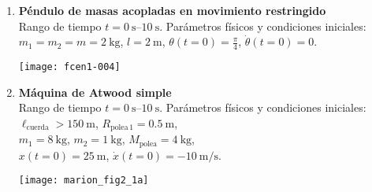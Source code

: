 \documentclass[11pt, spanish, a4paper, twoside]{article}
\begin{document}
\begin{enumerate}
\item 
\begin{minipage}[t][2.5cm]{0.7\textwidth}
\textbf{Péndulo de masas acopladas en movimiento restringido}\\ 
Rango de tiempo \(t = \SIrange{0}{10}{\second}\).
Parámetros físicos y condiciones iniciales:\\
\(m_1 = m_2 = m = \SI{2}{\kilo\gram}\), \(l = \SI{2}{\metre}\), \(\theta(t=0) = \frac{\pi}{4}\), \(\dot{\theta}(t=0) = 0\).
\end{minipage}
\begin{minipage}[c][1.5cm][t]{0.3\textwidth}
	\hspace{0.5cm}
   \texttt{[image: fcen1-004]}
\end{minipage}



%



\vspace{-0.9cm}
\item 
\begin{minipage}[t][3cm]{0.7\textwidth}
\textbf{Máquina de Atwood simple}\\
Rango de tiempo \(t = \SIrange{0}{10}{\second}\).
Parámetros físicos y condiciones iniciales:\\
\(\ell_\mathrm{cuerda} > \SI{150}{\metre}\), 
\(R_{\mathrm{polea}\,1} = \SI{0.5}{\metre}\), \\ 
\(m_1 = \SI{8}{\kilo\gram}\), 
\(m_2 = \SI{1}{\kilo\gram}\), 
\(M_\mathrm{polea} = \SI{4}{\kilo\gram}\), \\
\(x(t=0) = \SI{25}{\metre}\), 
\(\dot{x}(t=0) = -\SI{10}{\metre\per\second}\).
\end{minipage}
\begin{minipage}[c][3cm][t]{0.3\textwidth}
	\hspace{0.5cm}
	\texttt{[image: marion\_fig2\_1a]}
\end{minipage}




\end{enumerate}
\end{document}
